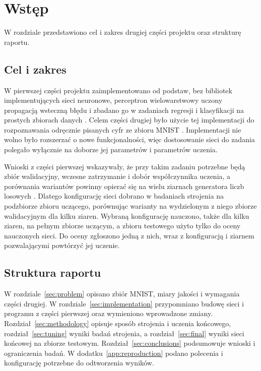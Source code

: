 \section{Wstęp}
\label{sec:introduction}

W rozdziale przedstawiono cel i zakres drugiej części projektu oraz strukturę raportu.

\subsection{Cel i zakres}
\label{sec:introduction-goal}

W pierwszej części projektu zaimplementowano od podstaw, bez bibliotek implementujących sieci neuronowe, perceptron wielowarstwowy uczony propagacją wsteczną błędu i zbadano go w zadaniach regresji i klasyfikacji na prostych zbiorach danych \cite{gracikowski2026}. Celem części drugiej było użycie tej implementacji do rozpoznawania odręcznie pisanych cyfr ze zbioru MNIST \cite{lecun1998}. Implementacji nie wolno było rozszerzać o nowe funkcjonalności, więc dostosowanie sieci do zadania polegało wyłącznie na doborze jej parametrów i parametrów uczenia.

Wnioski z części pierwszej wskazywały, że przy takim zadaniu potrzebne będą zbiór walidacyjny, wczesne zatrzymanie i dobór współczynnika uczenia, a porównania wariantów powinny opierać się na wielu ziarnach generatora liczb losowych \cite[rozdz.~10.2]{gracikowski2026}. Dlatego konfigurację sieci dobrano w badaniach strojenia na podzbiorze zbioru uczącego, porównując warianty na wydzielonym z niego zbiorze walidacyjnym dla kilku ziaren. Wybraną konfigurację nauczono, także dla kilku ziaren, na pełnym zbiorze uczącym, a zbioru testowego użyto tylko do oceny nauczonych sieci. Do oceny zgłoszono jedną z nich, wraz z konfiguracją i ziarnem pozwalającymi powtórzyć jej uczenie.

\subsection{Struktura raportu}
\label{sec:introduction-outline}

W rozdziale~\ref{sec:problem} opisano zbiór MNIST, miary jakości i wymagania części drugiej. W rozdziale~\ref{sec:implementation} przypomniano budowę sieci i programu z części pierwszej oraz wymieniono wprowadzone zmiany. Rozdział~\ref{sec:methodology} opisuje sposób strojenia i uczenia końcowego, rozdział~\ref{sec:tuning} wyniki badań strojenia, a rozdział~\ref{sec:final} wyniki sieci końcowej na zbiorze testowym. Rozdział~\ref{sec:conclusions} podsumowuje wnioski i ograniczenia badań. W dodatku~\ref{app:reproduction} podano polecenia i konfigurację potrzebne do odtworzenia wyników.
